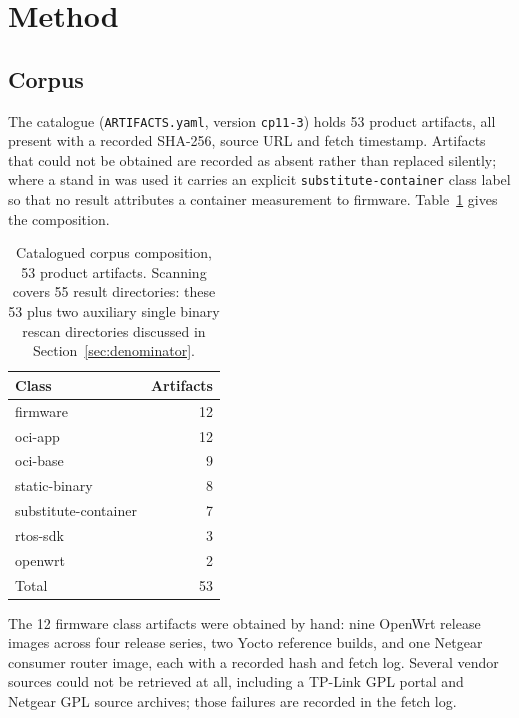 \section{Method}

\subsection{Corpus}

The catalogue (\texttt{ARTIFACTS.yaml}, version \texttt{cp11-3}) holds 53 product
artifacts, all present with a recorded SHA-256, source URL and fetch timestamp.
Artifacts that could not be obtained are recorded as absent rather than replaced
silently; where a stand in was used it carries an explicit
\texttt{substitute-container} class label so that no result attributes a
container measurement to firmware. Table~\ref{tab:corpus} gives the composition.

\begin{table}[t]
\caption{Catalogued corpus composition, 53 product artifacts. Scanning covers 55
result directories: these 53 plus two auxiliary single binary rescan directories
discussed in Section~\ref{sec:denominator}.}
\label{tab:corpus}
\centering
\begin{tabular}{lr}
\toprule
Class & Artifacts \\
\midrule
firmware & 12 \\
oci-app & 12 \\
oci-base & 9 \\
static-binary & 8 \\
substitute-container & 7 \\
rtos-sdk & 3 \\
openwrt & 2 \\
\midrule
Total & 53 \\
\bottomrule
\end{tabular}
\end{table}

The 12 firmware class artifacts were obtained by hand: nine OpenWrt release
images across four release series, two Yocto reference builds, and one Netgear
consumer router image, each with a recorded hash and fetch log. Several vendor
sources could not be retrieved at all, including a TP-Link GPL portal and Netgear
GPL source archives; those failures are recorded in the fetch log.

